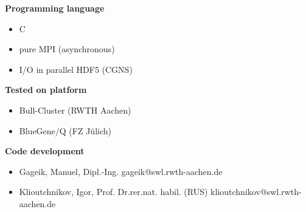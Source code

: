 \documentclass[a0,portrait]{a0poster}
\begin{document}
{{\begin{multicols}{3}
\textbf{Programming language}
\begin{itemize}
\item C
\item pure MPI (asynchronous)
\item I/O in parallel HDF5 (CGNS)
\end{itemize}

\textbf{Tested on platform}
\begin{itemize}
\item Bull-Cluster (RWTH Aachen)
\item BlueGene/Q (FZ J\"{u}lich)
\end{itemize}

\textbf{Code development}
\begin{itemize}
\item Gageik, Manuel, Dipl.-Ing. \newline gageik@swl.rwth-aachen.de 
\item Klioutchnikov, Igor, Prof. Dr.rer.nat. habil. (RUS) \newline klioutchnikov@swl.rwth-aachen.de 
\end{itemize}
      
    \end{multicols}
  }
}
\end{document}

